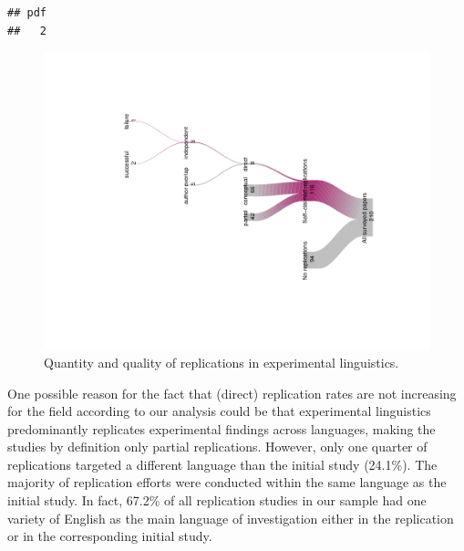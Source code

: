 \documentclass[]{elsarticle} %
\begin{document}
\begin{verbatim}
## pdf 
##   2
\end{verbatim}

\begin{figure}

{\centering \includegraphics{ReplicationLing_files/figure-latex/river-plot-1} 

}

\caption{Quantity and quality of replications in experimental linguistics.}\label{fig:river-plot}
\end{figure}

One possible reason for the fact that (direct) replication rates are not increasing for the field according to our analysis could be that experimental linguistics predominantly replicates experimental findings across languages, making the studies by definition only partial replications.
However, only one quarter of replications targeted a different language than the initial study (24.1\%).
The majority of replication efforts were conducted within the same language as the initial study.
In fact, 67.2\% of all replication studies in our sample had one variety of English as the main language of investigation either in the replication or in the corresponding initial study.
\end{document}

